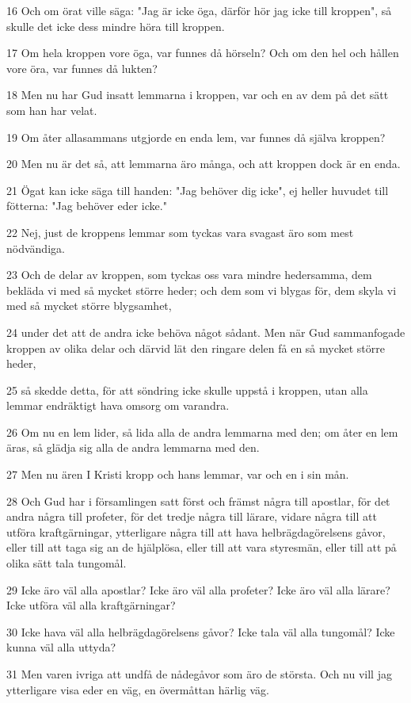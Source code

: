 \par 16 Och om örat ville säga: "Jag är icke öga, därför hör jag icke till kroppen", så skulle det icke dess mindre höra till kroppen.
\par 17 Om hela kroppen vore öga, var funnes då hörseln? Och om den hel och hållen vore öra, var funnes då lukten?
\par 18 Men nu har Gud insatt lemmarna i kroppen, var och en av dem på det sätt som han har velat.
\par 19 Om åter allasammans utgjorde en enda lem, var funnes då själva kroppen?
\par 20 Men nu är det så, att lemmarna äro många, och att kroppen dock är en enda.
\par 21 Ögat kan icke säga till handen: "Jag behöver dig icke", ej heller huvudet till fötterna: "Jag behöver eder icke."
\par 22 Nej, just de kroppens lemmar som tyckas vara svagast äro som mest nödvändiga.
\par 23 Och de delar av kroppen, som tyckas oss vara mindre hedersamma, dem bekläda vi med så mycket större heder; och dem som vi blygas för, dem skyla vi med så mycket större blygsamhet,
\par 24 under det att de andra icke behöva något sådant. Men när Gud sammanfogade kroppen av olika delar och därvid lät den ringare delen få en så mycket större heder,
\par 25 så skedde detta, för att söndring icke skulle uppstå i kroppen, utan alla lemmar endräktigt hava omsorg om varandra.
\par 26 Om nu en lem lider, så lida alla de andra lemmarna med den; om åter en lem äras, så glädja sig alla de andra lemmarna med den.
\par 27 Men nu ären I Kristi kropp och hans lemmar, var och en i sin mån.
\par 28 Och Gud har i församlingen satt först och främst några till apostlar, för det andra några till profeter, för det tredje några till lärare, vidare några till att utföra kraftgärningar, ytterligare några till att hava helbrägdagörelsens gåvor, eller till att taga sig an de hjälplösa, eller till att vara styresmän, eller till att på olika sätt tala tungomål.
\par 29 Icke äro väl alla apostlar? Icke äro väl alla profeter? Icke äro väl alla lärare? Icke utföra väl alla kraftgärningar?
\par 30 Icke hava väl alla helbrägdagörelsens gåvor? Icke tala väl alla tungomål? Icke kunna väl alla uttyda?
\par 31 Men varen ivriga att undfå de nådegåvor som äro de största. Och nu vill jag ytterligare visa eder en väg, en övermåttan härlig väg.

